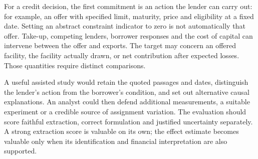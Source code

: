 For a credit decision, the first commitment is an action the lender can carry
out: for example, an offer with specified limit, maturity, price and eligibility
at a fixed date. Setting an abstract constraint indicator to zero is not
automatically that offer. Take-up, competing lenders, borrower responses and
the cost of capital can intervene between the offer and exports. The target
may concern an offered facility, the facility actually drawn, or net
contribution after expected losses. Those quantities require distinct
comparisons.

A useful assisted study would retain the quoted passages and dates, distinguish
the lender's action from the borrower's condition, and set out alternative
causal explanations. An analyst could then defend additional measurements,
a suitable experiment or a credible source of assignment variation. The
evaluation should score faithful extraction, correct formulation and justified
uncertainty separately. A strong extraction score is valuable on its own;
the effect estimate becomes valuable only when its identification and financial
interpretation are also supported.
